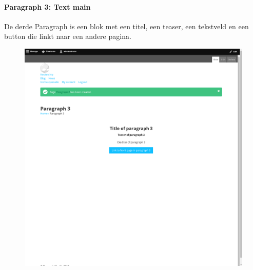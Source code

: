 \paragraph{Paragraph 3: Text main}
De derde Paragraph is een blok met een titel, een teaser, een tekstveld en een button die linkt naar een andere pagina.
\begin{figure}[h]
\includegraphics[width=1\textwidth]{img/p003.png}
\end{figure}

\clearpage

